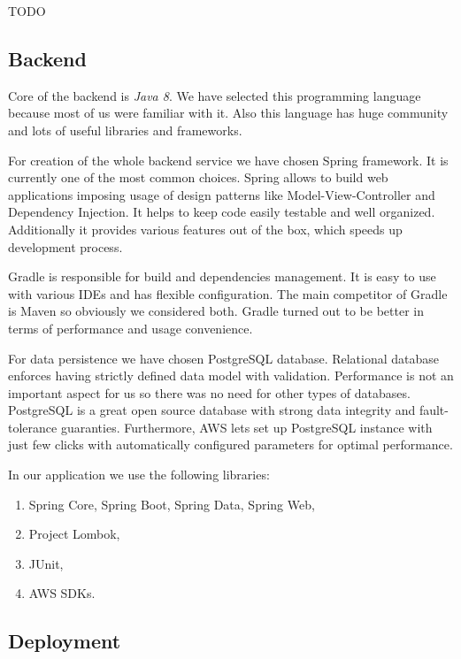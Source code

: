 \documentclass[licencjacka,en]{thesisclass}
\begin{document}
    TODO

    \subsection{Backend}

    Core of the backend is \textit{Java 8}.
    We have selected this programming language because most of us were familiar with it.
    Also this language has huge community and lots of useful libraries and frameworks.

    For creation of the whole backend service we have chosen Spring \cite{Spring} framework.
    It is currently one of the most common choices.
    Spring allows to build web applications imposing usage of design patterns like Model-View-Controller and Dependency Injection.
    It helps to keep code easily testable and well organized.
    Additionally it provides various features out of the box, which speeds up development process.

    Gradle \cite{Gradle} is responsible for build and dependencies management.
    It is easy to use with various IDEs and has flexible configuration.
    The main competitor of Gradle is Maven so obviously we considered both.
    Gradle turned out to be better in terms of performance and usage convenience.

    For data persistence we have chosen PostgreSQL database.
    Relational database enforces having strictly defined data model with validation.
    Performance is not an important aspect for us so there was no need for other types of databases.
    PostgreSQL is a great open source database with strong data integrity and fault-tolerance guaranties.
    Furthermore, AWS lets set up PostgreSQL instance with just few clicks with automatically configured parameters for optimal performance.

    In our application we use the following libraries:
    \begin{enumerate}
        \item Spring Core, Spring Boot, Spring Data, Spring Web,
        \item Project Lombok,
        \item JUnit,
        \item AWS SDKs.
    \end{enumerate}

    \subsection{Deployment}
\end{document}
